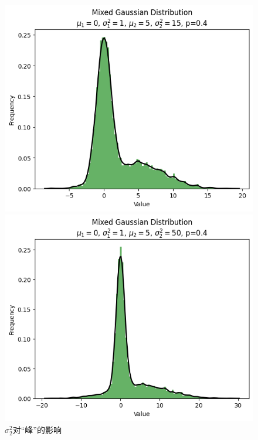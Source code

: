 \documentclass{article}
\begin{document}
\begin{figure}[H]
\begin{minipage}[b]{0.3\linewidth}
        \caption{$\sigma_2^2=5$}
    \end{minipage}
    \hfill
    \begin{minipage}[b]{0.3\linewidth}
        \centering
        \includegraphics[width=\linewidth]{figure/sigma_^2=15.png}
        \caption{$\sigma_2^2=15$}
    \end{minipage}
    \hfill
    \begin{minipage}[b]{0.3\linewidth}
        \centering
        \includegraphics[width=\linewidth]{figure/sigma_^2=50.png}
        \caption{$\sigma_2^2 =50$}
    \end{minipage}
    \caption{$\sigma_2^2$对“峰”的影响}
    \label{fig:sigma_2}
\end{figure}
\end{document}
